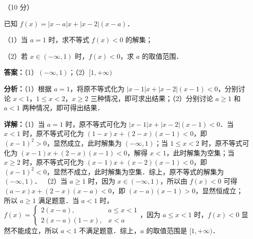 \begin{question}[points=10]
[选修 4-5：不等式选讲]（10 分）

已知 $f(x)=|x-a|x+|x-2|(x-a)$．

（1）当 $a=1$ 时，求不等式 $f(x)<0$ 的解集；

（2）若 $x\in(-\infty,1)$ 时，$f(x)<0$，求 $a$ 的取值范围．
\begin{solution}
\textbf{答案：}（1）$(-\infty,1)$；（2）$[1,+\infty)$

\textbf{分析：}（1）根据 $a=1$，将原不等式化为 $|x-1|x+|x-2|(x-1)<0$，分别讨论 $x<1$，$1\leq x<2$，$x\geq 2$ 三种情况，即可求出结果；（2）分别讨论 $a\geq 1$ 和 $a<1$ 两种情况，即可得出结果．

\textbf{详解：}（1）当 $a=1$ 时，原不等式可化为 $|x-1|x+|x-2|(x-1)<0$．当 $x<1$ 时，原不等式可化为 $(1-x)x+(2-x)(x-1)<0$，即 $(x-1)^2>0$，显然成立，此时解集为 $(-\infty,1)$；当 $1\leq x<2$ 时，原不等式可化为 $(x-1)x+(2-x)(x-1)<0$，解得 $x<1$，此时解集为空集；当 $x\geq 2$ 时，原不等式可化为 $(x-1)x+(x-2)(x-1)<0$，即 $(x-1)^2<0$，显然不成立，此时解集为空集．综上，原不等式的解集为 $(-\infty,1)$．
（2）当 $a\geq 1$ 时，因为 $x\in(-\infty,1)$，所以由 $f(x)<0$ 可得 $(a-x)x+(2-x)(x-a)<0$，即 $(x-a)(x-1)>0$，显然恒成立；所以 $a\geq 1$ 满足题意．当 $a<1$ 时，$f(x)=\begin{cases} 2(x-a), & a\leq x<1 \\ 2(x-a)(1-x), & x<a \end{cases}$，因为 $a\leq x<1$ 时，$f(x)<0$ 显然不能成立，所以 $a<1$ 不满足题意．综上，$a$ 的取值范围是 $[1,+\infty)$．
\end{solution}
\end{question}

